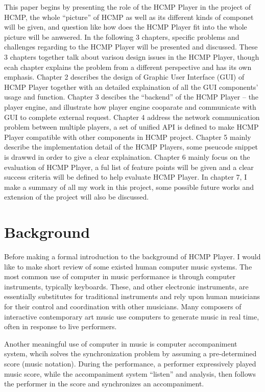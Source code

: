 This paper begins by presenting the role of the HCMP Player in the project
of HCMP, the whole ``picture'' of HCMP as well as its different kinds of 
componet will be given, and question like how does the HCMP Player fit 
into the whole picture will be anwsered. In the following 3 chapters, 
specific problems and challenges regarding to the HCMP Player will be 
presented and discussed. These 3 chapters together talk about varisou design 
issues in the HCMP Player, though ecah chapter 
explains the problem from a different perspective and has its own emphasis. 
Chapter 2 describes the design of Graphic User 
Interface (GUI) of HCMP Player together with an detailed explaination of 
all the GUI components' usage and function. 
Chapter 3 descibes the ``backend'' of the HCMP Player -- the player engine, and 
illustrate how player engine cooparate and communicate with GUI to complete 
external request.
Chapter 4 address the network communication problem between 
multiple players, a set of unified API is defined to make HCMP Player compatible 
with other components in HCMP project. Chapter 5 mainly describe the 
implementation detail of the HCMP Players, some pseucode snippet is drawwd 
in order to give a clear explaination. Chapter 6 
mainly focus on the evaluation of HCMP Player, a ful list of feature points will 
be given and a clear success criteria will be defined to help evaluate HCMP 
Player. In chapter 7, 
I make a summary of all my work in this project, some possible future works and
extension of the project will also be discussed.

\section{Background}
Before making a formal introduction to the background of HCMP Player. 
I would like to make short review of  
some existed human computer music systems. The most common use of computer in
music performance is through computer instruments, typically keyboards.
These, and other electronic instruments, are essentially substitutes for traditional
instruments and rely upon human musicians for their control and coordination with
other musicians. Many composers of interactive contemporary art music use computers
to generate music in real time, often in response to live performers.

Another meaningful use of computer in music is computer accompaniment system, 
whcih solves the synchronization problem by assuming a pre-determined 
score (music notation). During the performance, a performer expressively 
played music score, while the accompaniment system ``listen'' and analysis, 
then follows the performer 
in the score and synchronizes an accompaniment.

